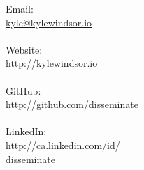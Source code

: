 
\begin{minipage}[t]{0.25\hsize}\color{contact} %
	Email:\\
	\href{mailto:kyle@kylewindsor.io}{kyle@kylewindsor.io}\\
	\\
	Website:\\
	\href{http://kylewindsor.io}{http://kylewindsor.io}\\
	\\
	GitHub:\\
	\href{http://github.com/disseminate/}{http://github.com/disseminate}\\
	\\
	LinkedIn:\\
	\href{http://ca.linkedin.com/in/disseminate}{http://ca.linkedin.com/id/\\disseminate}\\
	\\
	
\end{minipage}
